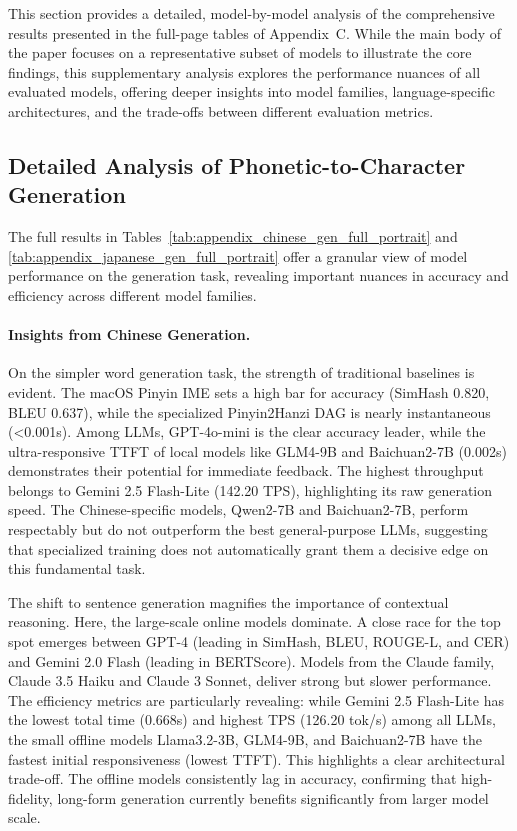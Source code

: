 \documentclass[10pt, a4paper]{article}
\begin{document}
This section provides a detailed, model-by-model analysis of the comprehensive results presented in the full-page tables of Appendix~C. While the main body of the paper focuses on a representative subset of models to illustrate the core findings, this supplementary analysis explores the performance nuances of all evaluated models, offering deeper insights into model families, language-specific architectures, and the trade-offs between different evaluation metrics.

\subsection{Detailed Analysis of Phonetic-to-Character Generation}

The full results in Tables~\ref{tab:appendix_chinese_gen_full_portrait} and \ref{tab:appendix_japanese_gen_full_portrait} offer a granular view of model performance on the generation task, revealing important nuances in accuracy and efficiency across different model families.

\paragraph{Insights from Chinese Generation.}
On the simpler word generation task, the strength of traditional baselines is evident. The {macOS Pinyin} IME sets a high bar for accuracy (SimHash 0.820, BLEU 0.637), while the specialized {Pinyin2Hanzi DAG} is nearly instantaneous (<0.001s). Among LLMs, {GPT-4o-mini} is the clear accuracy leader, while the ultra-responsive TTFT of local models like {GLM4-9B} and {Baichuan2-7B} (0.002s) demonstrates their potential for immediate feedback. The highest throughput belongs to Gemini 2.5 Flash-Lite (142.20 TPS), highlighting its raw generation speed. The Chinese-specific models, {Qwen2-7B} and {Baichuan2-7B}, perform respectably but do not outperform the best general-purpose LLMs, suggesting that specialized training does not automatically grant them a decisive edge on this fundamental task.

The shift to sentence generation magnifies the importance of contextual reasoning. Here, the large-scale online models dominate. A close race for the top spot emerges between {GPT-4} (leading in SimHash, BLEU, ROUGE-L, and CER) and {Gemini 2.0 Flash} (leading in BERTScore). Models from the Claude family, {Claude 3.5 Haiku} and {Claude 3 Sonnet}, deliver strong but slower performance. The efficiency metrics are particularly revealing: while {Gemini 2.5 Flash-Lite} has the lowest total time (0.668s) and highest TPS (126.20 tok/s) among all LLMs, the small offline models {Llama3.2-3B}, {GLM4-9B}, and {Baichuan2-7B} have the fastest initial responsiveness (lowest TTFT). This highlights a clear architectural trade-off. The offline models consistently lag in accuracy, confirming that high-fidelity, long-form generation currently benefits significantly from larger model scale.
\end{document}
